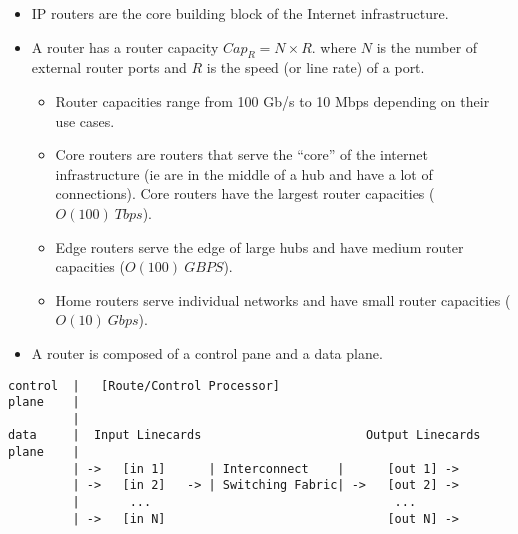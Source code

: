 \documentclass[]{article}
\providecommand{\tightlist}{%
  \setlength{\itemsep}{0pt}\setlength{\parskip}{0pt}}
\begin{document}
\begin{itemize}
\tightlist
\item
  IP routers are the core building block of the Internet infrastructure.
\item
  A router has a router capacity \(Cap_R = N \times R\). where \(N\) is
  the number of external router ports and \(R\) is the speed (or line
  rate) of a port.

  \begin{itemize}
  \tightlist
  \item
    Router capacities range from 100 Gb/s to 10 Mbps depending on their
    use cases.
  \item
    Core routers are routers that serve the ``core'' of the internet
    infrastructure (ie are in the middle of a hub and have a lot of
    connections). Core routers have the largest router capacities
    (\(O(100)\ Tbps\)).
  \item
    Edge routers serve the edge of large hubs and have medium router
    capacities (\(O(100)\ GBPS\)).
  \item
    Home routers serve individual networks and have small router
    capacities (\(O(10)\ Gbps\)).
  \end{itemize}
\item
  A router is composed of a control pane and a data plane.
\end{itemize}

\begin{verbatim}
control  |   [Route/Control Processor]
plane    |
         |
data     |  Input Linecards                       Output Linecards
plane    |
         | ->   [in 1]      | Interconnect    |      [out 1] ->
         | ->   [in 2]   -> | Switching Fabric| ->   [out 2] ->
         |       ...                                  ...
         | ->   [in N]                               [out N] ->
\end{verbatim}
\end{document}
